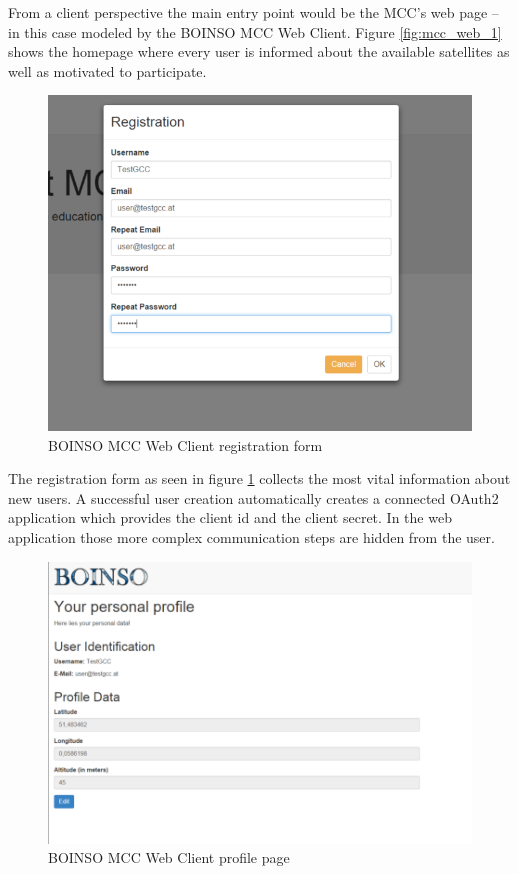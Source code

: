 \documentclass[BachelorPaper]{subfiles}
\begin{document}
From a client perspective the main entry point would be the \ac{MCC}'s web page -- in this case modeled by the BOINSO MCC Web Client. Figure \ref{fig:mcc_web_1} shows the homepage where every user is informed about the available satellites as well as motivated to participate. \\

\begin{figure}[!htbp]
\centering
\includegraphics[width=0.96\linewidth]{PICs/BacPics/results/mcc_webapp_2.png}
\caption{BOINSO MCC Web Client registration form}\label{fig:mcc_web_2}
\end{figure}

The registration form as seen in figure \ref{fig:mcc_web_2} collects the most vital information about new users. A successful user creation automatically creates a connected OAuth2 application which provides the client id and the client secret. In the web application those more complex communication steps are hidden from the user. \\

\begin{figure}[!htbp]
\centering
\includegraphics[width=0.96\linewidth]{PICs/BacPics/results/mcc_webapp_3.png}
\caption{BOINSO MCC Web Client profile page}\label{fig:mcc_web_3}
\end{figure}
\end{document}
